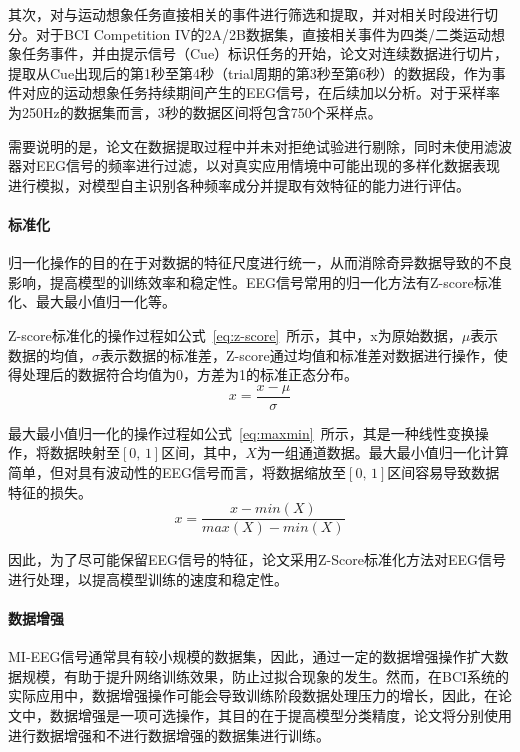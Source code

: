 其次，对与运动想象任务直接相关的事件进行筛选和提取，并对相关时段进行切分。对于BCI Competition IV的2A/2B数据集，直接相关事件为四类/二类运动想象任务事件，并由提示信号（Cue）标识任务的开始，论文对连续数据进行切片，提取从Cue出现后的第1秒至第4秒（trial周期的第3秒至第6秒）的数据段，作为事件对应的运动想象任务持续期间产生的EEG信号，在后续加以分析。对于采样率为250Hz的数据集而言，3秒的数据区间将包含750个采样点。

需要说明的是，论文在数据提取过程中并未对拒绝试验进行剔除，同时未使用滤波器对EEG信号的频率进行过滤，以对真实应用情境中可能出现的多样化数据表现进行模拟，对模型自主识别各种频率成分并提取有效特征的能力进行评估。

\paragraph{标准化}

归一化操作的目的在于对数据的特征尺度进行统一，从而消除奇异数据导致的不良影响，提高模型的训练效率和稳定性。EEG信号常用的归一化方法有Z-score标准化、最大最小值归一化等。

Z-score标准化的操作过程如公式~\ref{eq:z-score}~所示，其中，x为原始数据，\(\mu\)表示数据的均值，\(\sigma\)表示数据的标准差，Z-score通过均值和标准差对数据进行操作，使得处理后的数据符合均值为0，方差为1的标准正态分布。
\begin{equation}
    x=\frac{x-\mu}{\sigma}
    \label{eq:z-score}
\end{equation}

最大最小值归一化的操作过程如公式~\ref{eq:maxmin}~所示，其是一种线性变换操作，将数据映射至\([0,\,1]\)区间，其中，\(X\)为一组通道数据。最大最小值归一化计算简单，但对具有波动性的EEG信号而言，将数据缩放至\([0,\,1]\)区间容易导致数据特征的损失。
\begin{equation}
    x=\frac{x-min(X)}{max(X)-min(X)}
    \label{eq:maxmin}
\end{equation}

因此，为了尽可能保留EEG信号的特征，论文采用Z-Score标准化方法对EEG信号进行处理，以提高模型训练的速度和稳定性。

\paragraph{数据增强}

MI-EEG信号通常具有较小规模的数据集，因此，通过一定的数据增强操作扩大数据规模，有助于提升网络训练效果，防止过拟合现象的发生。然而，在BCI系统的实际应用中，数据增强操作可能会导致训练阶段数据处理压力的增长，因此，在论文中，数据增强是一项可选操作，其目的在于提高模型分类精度，论文将分别使用进行数据增强和不进行数据增强的数据集进行训练。

